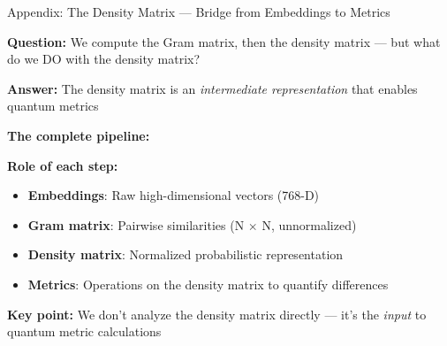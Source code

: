 \documentclass[aspectratio=169,11pt]{beamer}
\begin{document}
\begin{frame}{Appendix: The Density Matrix — Bridge from Embeddings to Metrics}

\textbf{Question:} We compute the Gram matrix, then the density matrix — but what do we DO with the density matrix?

\vspace{0.5em}

\textbf{Answer:} The density matrix is an \emph{intermediate representation} that enables quantum metrics

\vspace{0.5em}

\textbf{The complete pipeline:}

\vspace{0.3em}

\begin{center}
\end{center}

\vspace{0.5em}

\textbf{Role of each step:}
\begin{itemize}
  \item \textbf{Embeddings}: Raw high-dimensional vectors (768-D)
  \item \textbf{Gram matrix}: Pairwise similarities (N $\times$ N, unnormalized)
  \item \textbf{Density matrix}: Normalized probabilistic representation
  \item \textbf{Metrics}: Operations on the density matrix to quantify differences
\end{itemize}

\vspace{0.3em}

\textbf{Key point:} We don't analyze the density matrix directly — it's the \emph{input} to quantum metric calculations

\end{frame}
\end{document}
